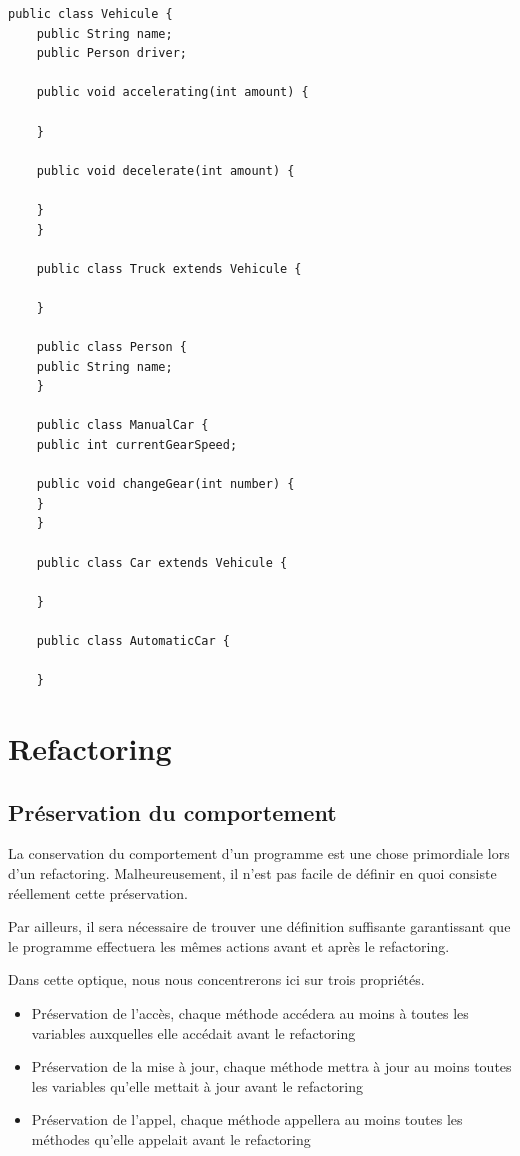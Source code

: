 \documentclass[a4paper, 12pt]{article}
\begin{document}
  \begin{lstlisting}[frame=single]
    public class Vehicule {
    public String name;
    public Person driver;

    public void accelerating(int amount) {

    }

    public void decelerate(int amount) {

    }
    }

    public class Truck extends Vehicule {

    }

    public class Person {
    public String name;
    }

    public class ManualCar {
    public int currentGearSpeed;

    public void changeGear(int number) {
    }
    }

    public class Car extends Vehicule {

    }

    public class AutomaticCar {

    }
  \end{lstlisting}

  \newpage
  \section{Refactoring}

  \subsection{Préservation du comportement}
  \label{subsec:preservationDuComportement}

  La conservation du comportement d'un programme est une chose primordiale lors d'un refactoring.
  Malheureusement, il n'est pas facile de définir en quoi consiste réellement cette préservation.

  Par ailleurs, il sera nécessaire de trouver une définition suffisante garantissant que le programme effectuera les mêmes actions avant et après le refactoring.

  Dans cette optique, nous nous concentrerons ici sur trois propriétés.

  \begin{itemize}[label=\textbullet]
    \item Préservation de l'accès, chaque méthode accédera au moins à toutes les variables auxquelles elle accédait avant le refactoring
    \item Préservation de la mise à jour, chaque méthode mettra à jour au moins toutes les variables qu'elle mettait à jour avant le refactoring
    \item Préservation de l'appel, chaque méthode appellera au moins toutes les méthodes qu'elle appelait avant le refactoring
  \end{itemize}
\end{document}
